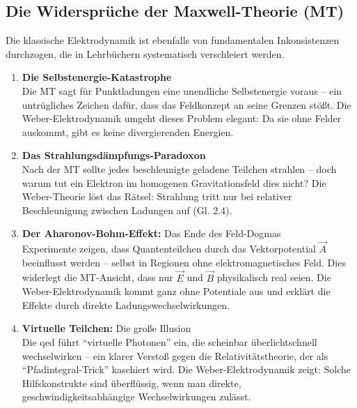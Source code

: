 \subsection{Die Widersprüche der Maxwell-Theorie (MT)}
Die klassische Elektrodynamik ist ebenfalls von fundamentalen Inkonsistenzen durchzogen, die in Lehrbüchern systematisch verschleiert werden.
\begin{enumerate}
    \item \textbf{Die Selbstenergie-Katastrophe}\\Die MT sagt für Punktladungen eine unendliche Selbstenergie voraus – ein untrügliches Zeichen dafür, dass das Feldkonzept an seine Grenzen stößt. Die Weber-Elektrodynamik umgeht dieses Problem elegant: Da sie ohne Felder auskommt, gibt es keine divergierenden Energien.
    \item \textbf{Das Strahlungsdämpfungs-Paradoxon}\\Nach der MT sollte jedes beschleunigte geladene Teilchen strahlen – doch warum tut ein Elektron im homogenen Gravitationsfeld dies nicht? Die Weber-Theorie löst das Rätsel: Strahlung tritt nur bei relativer Beschleunigung zwischen Ladungen auf (Gl. 2.4).
    \item \textbf{Der Aharonov-Bohm-Effekt:} Das Ende des Feld-Dogmas\\Experimente zeigen, dass Quantenteilchen durch das Vektorpotential $\vec{A}$ beeinflusst werden – selbst in Regionen ohne elektromagnetisches Feld. Dies widerlegt die MT-Ansicht, dass nur $\vec{E}$ und $\vec{B}$ physikalisch real seien. Die Weber-Elektrodynamik kommt ganz ohne Potentiale aus und erklärt die Effekte durch direkte Ladungswechselwirkungen.
    \item \textbf{Virtuelle Teilchen:} Die große Illusion\\Die \gls{qed} führt \enquote{virtuelle Photonen} ein, die scheinbar überlichtschnell wechselwirken – ein klarer Verstoß gegen die Relativitätstheorie, der als \enquote{Pfadintegral-Trick} kaschiert wird. Die Weber-Elektrodynamik zeigt: Solche Hilfskonstrukte sind überflüssig, wenn man direkte, geschwindigkeitsabhängige Wechselwirkungen zulässt.
\end{enumerate}
